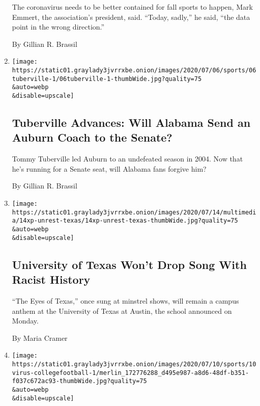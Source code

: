 \begin{enumerate}
  The coronavirus needs to be better contained for fall sports to
  happen, Mark Emmert, the association's president, said. ``Today,
  sadly,'' he said, ``the data point in the wrong direction.''

  By Gillian R. Brassil
\item
  \href{/2020/07/15/sports/tommy-tuberville-alabama-auburn.html}{}

  \texttt{[image: https://static01.graylady3jvrrxbe.onion/images/2020/07/06/sports/06tuberville-1/06tuberville-1-thumbWide.jpg?quality=75\\\&auto=webp\\\&disable=upscale]}

  \hypertarget{tuberville-advances-will-alabama-send-an-auburn-coach-to-the-senate}{%
  \subsection{Tuberville Advances: Will Alabama Send an Auburn Coach to
  the
  Senate?}\label{tuberville-advances-will-alabama-send-an-auburn-coach-to-the-senate}}

  Tommy Tuberville led Auburn to an undefeated season in 2004. Now that
  he's running for a Senate seat, will Alabama fans forgive him?

  By Gillian R. Brassil
\item
  \href{/2020/07/14/us/eyes-of-texas-football.html}{}

  \texttt{[image: https://static01.graylady3jvrrxbe.onion/images/2020/07/14/multimedia/14xp-unrest-texas/14xp-unrest-texas-thumbWide.jpg?quality=75\\\&auto=webp\\\&disable=upscale]}

  \hypertarget{university-of-texas-wont-drop-song-with-racist-history}{%
  \subsection{University of Texas Won't Drop Song With Racist
  History}\label{university-of-texas-wont-drop-song-with-racist-history}}

  ``The Eyes of Texas,'' once sung at minstrel shows, will remain a
  campus anthem at the University of Texas at Austin, the school
  announced on Monday.

  By Maria Cramer
\item
  \href{/2020/07/10/sports/ncaafootball/coronavirus-college-football-season-canceled.html}{}

  \texttt{[image: https://static01.graylady3jvrrxbe.onion/images/2020/07/10/sports/10virus-collegefootball-1/merlin\_172776288\_d495e987-a8d6-48df-b351-f037c672ac93-thumbWide.jpg?quality=75\\\&auto=webp\\\&disable=upscale]}


\end{enumerate}
